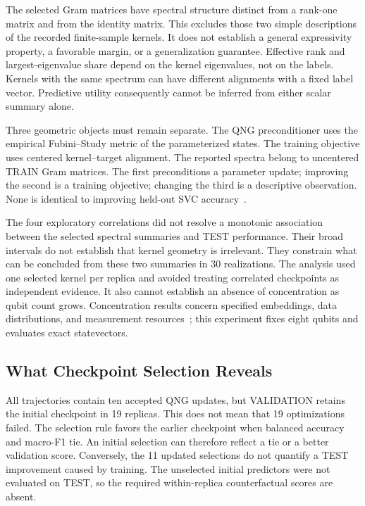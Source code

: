 The selected Gram matrices have spectral structure distinct from a rank-one matrix and from the identity matrix. This excludes those two simple descriptions of the recorded finite-sample kernels. It does not establish a general expressivity property, a favorable margin, or a generalization guarantee. Effective rank and largest-eigenvalue share depend on the kernel eigenvalues, not on the labels. Kernels with the same spectrum can have different alignments with a fixed label vector. Predictive utility consequently cannot be inferred from either scalar summary alone.

Three geometric objects must remain separate. The QNG preconditioner uses the empirical Fubini--Study metric of the parameterized states. The training objective uses centered kernel--target alignment. The reported spectra belong to uncentered TRAIN Gram matrices. The first preconditions a parameter update; improving the second is a training objective; changing the third is a descriptive observation. None is identical to improving held-out SVC accuracy~\cite{stokes2020qng,cortes2012alignment}.

The four exploratory correlations did not resolve a monotonic association between the selected spectral summaries and TEST performance. Their broad intervals do not establish that kernel geometry is irrelevant. They constrain what can be concluded from these two summaries in 30 realizations. The analysis used one selected kernel per replica and avoided treating correlated checkpoints as independent evidence. It also cannot establish an absence of concentration as qubit count grows. Concentration results concern specified embeddings, data distributions, and measurement resources~\cite{thanasilp2024concentration}; this experiment fixes eight qubits and evaluates exact statevectors.

\subsection{What Checkpoint Selection Reveals}
\label{sec:discussion-selection}

All trajectories contain ten accepted QNG updates, but VALIDATION retains the initial checkpoint in 19 replicas. This does not mean that 19 optimizations failed. The selection rule favors the earlier checkpoint when balanced accuracy and macro-F1 tie. An initial selection can therefore reflect a tie or a better validation score. Conversely, the 11 updated selections do not quantify a TEST improvement caused by training. The unselected initial predictors were not evaluated on TEST, so the required within-replica counterfactual scores are absent.

